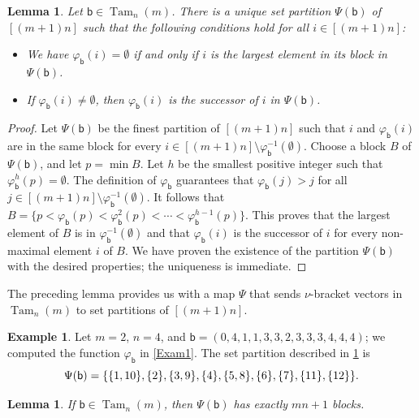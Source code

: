 \documentclass[11pt]{amsart}
\newtheorem{lemma}[theorem]{Lemma}
\theoremstyle{definition}
\newtheorem{example}[theorem]{Example}
\DeclareMathOperator{\Tam}{Tam}
\begin{document}
\begin{lemma}\label{lem:Psi1}
Let $\mathsf b\in\Tam_n(m)$. There is a unique set partition $\Psi(\mathsf b)$ of $[(m+1)n]$ such that the following conditions hold for all $i\in[(m+1)n]$:
\begin{itemize}
    \item We have $\varphi_{\mathsf b}(i)=\emptyset$ if and only if $i$ is the largest element in its block in $\Psi(\mathsf b)$.
    \item If $\varphi_{\mathsf b}(i)\neq\emptyset$, then $\varphi_{\mathsf b}(i)$ is the successor of $i$ in $\Psi(\mathsf b)$.
\end{itemize}
\end{lemma}

\begin{proof}
Let $\Psi(\mathsf b)$ be the finest partition of $[(m+1)n]$ such that $i$ and $\varphi_{\mathsf b}(i)$ are in the same block for every $i\in[(m+1)n]\setminus\varphi_{\mathsf b}^{-1}(\emptyset)$. Choose a block $B$ of $\Psi(\mathsf b)$, and let $p=\min B$. Let $h$ be the smallest positive integer such that $\varphi_{\mathsf b}^h(p)=\emptyset$. The definition of $\varphi_{\mathsf b}$ guarantees that $\varphi_{\mathsf b}(j)>j$ for all $j\in[(m+1)n]\setminus\varphi_{\mathsf b}^{-1}(\emptyset)$. It follows that $B=\{p<\varphi_{\mathsf b}(p)<\varphi_{\mathsf b}^2(p)<\cdots<\varphi_{\mathsf b}^{h-1}(p)\}$. This proves that the largest element of $B$ is in $\varphi_{\mathsf b}^{-1}(\emptyset)$ and that $\varphi_{\mathsf b}(i)$ is the successor of $i$ for every non-maximal element $i$ of $B$. We have proven the existence of the partition $\Psi(\mathsf b)$ with the desired properties; the uniqueness is immediate.
\end{proof}

The preceding lemma provides us with a map $\Psi$ that sends $\nu$-bracket vectors in $\Tam_n(m)$ to set partitions of $[(m+1)n]$. 

\begin{example}
Let $m=2$, $n=4$, and $\mathsf b=(0,4,1,1,3,3,2,3,3,3,4,4,4)$; we computed the function $\varphi_{\mathsf b}$ in \cref{Exam1}. The set partition described in \cref{lem:Psi1} is \[\Psi(\mathsf b)=\{\{1,10\},\{2\},\{3,9\},\{4\},\{5,8\},\{6\},\{7\},\{11\},\{12\}\}. \qedhere\]
\end{example}

\begin{lemma}\label{lem:mn+1blocks}
If $\mathsf b\in\Tam_n(m)$, then $\Psi(\mathsf b)$ has exactly $mn+1$ blocks.
\end{lemma}
\end{document}
